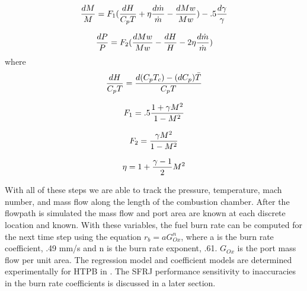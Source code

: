 \begin{equation}
\centering   
\frac{dM}{M}=F_1 (\frac{dH}{C_pT}+\eta\frac{d\dot{m}}{\dot{m}}-\frac{dMw}{Mw})-.5\frac{d\gamma}{\gamma}
\end{equation}

\begin{equation}
\centering   
\frac{dP}{P}=F_2 (\frac{dMw}{Mw}-\frac{dH}{H}-2\eta\frac{d\dot{m}}{\dot{m}}) 
\end{equation}
where
\begin{equation}
\centering   
\frac{dH}{C_pT}=\frac{d(C_pT_c)-(dC_p)\Bar{T}}{C_pT}
\end{equation}

\begin{equation}
\centering   
F_1=.5\frac{1+\gamma M^2}{1-M^2}
\end{equation}

\begin{equation}
\centering   
F_2=\frac{\gamma M^2}{1-M^2}
\end{equation}

\begin{equation}
\centering   
\eta=1+\frac{\gamma-1}{2}M^2
\end{equation}

With all of these steps we are able to track the pressure, temperature, mach number, and mass flow along the length of the combustion chamber. After the flowpath is simulated the mass flow and port area are known at each discrete location and known. With these variables, the fuel burn rate can be computed for the next time step using the equation $r_b=aG_{Ox}^n$, where a is the burn rate coefficient, .49 mm/s and n is the burn rate exponent, .61. $G_{Ox}$ is the port mass flow per unit area. The regression model and coefficient models are determined experimentally for HTPB in \cite{Pourpoint}. The SFRJ performance sensitivity to inaccuracies in the burn rate coefficients is discussed in a later section. \\ \indent

